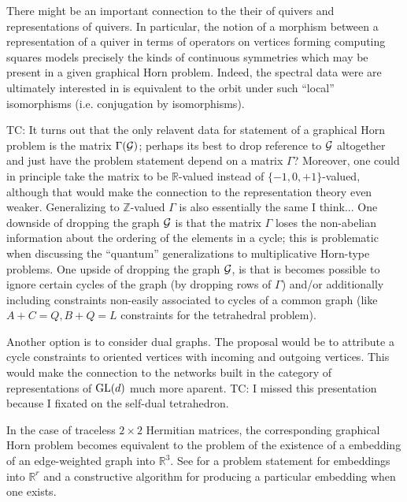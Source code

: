 \documentclass[notitlepage, 10pt]{article}
\begin{document}
{\color{red}
    There might be an important connection to the their of quivers and representations of quivers. 
    In particular, the notion of a morphism between a representation of a quiver in terms of operators on vertices forming computing squares models precisely the kinds of continuous symmetries which may be present in a given graphical Horn problem. 
    Indeed, the spectral data were are ultimately interested in is equivalent to the orbit under such ``local'' isomorphisms (i.e. conjugation by isomorphisms).
}

{\color{red}
    TC: It turns out that the only relavent data for statement of a graphical Horn problem is the matrix $\Gamma(\mathcal G)$; perhaps its best to drop reference to $\mathcal G$ altogether and just have the problem statement depend on a matrix $\Gamma$?
    Moreover, one could in principle take the matrix to be $\mathbb R$-valued instead of $\{-1, 0, +1\}$-valued, although that would make the connection to the representation theory even weaker.
    Generalizing to $\mathbb Z$-valued $\Gamma$ is also essentially the same I think...
    One downside of dropping the graph $\mathcal G$ is that the matrix $\Gamma$ loses the non-abelian information about the ordering of the elements in a cycle; this is problematic when discussing the ``quantum'' generalizations to multiplicative Horn-type problems.
    One upside of dropping the graph $\mathcal G$, is that is becomes possible to ignore certain cycles of the graph (by dropping rows of $\Gamma$) and/or additionally including constraints non-easily associated to cycles of a common graph (like $A+C=Q, B+Q=L$ constraints for the tetrahedral problem).
}

{\color{red}
    Another option is to consider dual graphs. 
    The proposal would be to attribute a cycle constraints to oriented vertices with incoming and outgoing vertices.
    This would make the connection to the networks built in the category of representations of $\operatorname{GL}(d)$ much more aparent.
    TC: I missed this presentation because I fixated on the self-dual tetrahedron.
}

{\color{red}
    In the case of traceless $2\times 2$ Hermitian matrices, the corresponding graphical Horn problem becomes equivalent to the problem of the existence of a embedding of an edge-weighted graph into $\mathbb R^{3}$. See \cite{alfakih1998embeddability} for a problem statement for embeddings into $\mathbb R^{r}$ and a constructive algorithm for producing a particular embedding when one exists.
}
\end{document}
